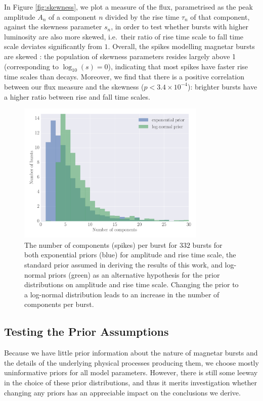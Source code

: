 \documentclass[12pt]{emulateapj}
\begin{document}
In Figure \ref{fig:skewness}, we plot a measure of the flux, parametrised as the peak amplitude $A_n$ of a component $n$ divided by the rise time $\tau_n$ of that component,
against the skewness parameter $s_n$, in order to test whether bursts with higher luminosity are also more skewed, i.e.\ their ratio of rise time scale to fall time scale deviates significantly
from $1$. Overall, the spikes modelling magnetar bursts are skewed \citep[see also ][]{gogus1999,vanderhorst2012}: the population of 
skewness parameters resides largely above 1 (corresponding to $\log_{10}{(s)} = 0$), indicating that most
spikes have faster rise time scales than decays. Moreover, we find that there is a positive correlation between our flux measure and the skewness ($ p < 3.4 × 10^{−4}$): brighter bursts have a higher
ratio between rise and fall time scales. 

 \begin{figure}[htbp]
\begin{center}
\includegraphics[width=9cm]{f9.pdf}%
\caption{The number of  components (spikes) per burst for $332$ bursts for both exponential priors (blue) for amplitude and rise time scale, the standard prior assumed in
deriving the results of this work, and log-normal priors (green) as an alternative hypothesis for the prior distributions on amplitude and rise time scale. Changing the prior to a log-normal
distribution leads to an increase in the number of components per burst.}
\label{fig:nspikes_prior}
\end{center}
\end{figure}



\subsection{Testing the Prior Assumptions}
\label{ch6:priortest}
Because we have little prior information about the nature of magnetar bursts and the details of
the underlying physical processes producing them, we choose mostly uninformative priors for all model parameters. However,
there is still some leeway in the choice of these prior distributions, and thus it merits investigation whether changing
any priors has an appreciable impact on the conclusions we derive. 
\end{document}
